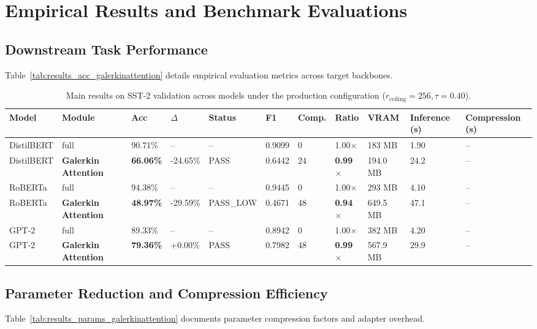 \section{Empirical Results and Benchmark Evaluations}

\subsection{Downstream Task Performance}
Table~\ref{tab:results_acc_galerkinattention} details empirical evaluation metrics across target backbones.

\begin{table}[t]
\centering
\small
\begin{tabular}{lllllllllll}
\toprule
\textbf{Model} & \textbf{Module} & \textbf{Acc} & \textbf{$\Delta$} & \textbf{Status} & \textbf{F1} & \textbf{Comp.} & \textbf{Ratio} & \textbf{VRAM} & \textbf{Inference (s)} & \textbf{Compression (s)} \\
\midrule
DistilBERT & full & 90.71\% & -- & -- & 0.9099 & 0 & 1.00$\times$ & 183 MB & 1.90 & -- \\
DistilBERT & \textbf{Galerkin Attention} & \textbf{66.06\%} & -24.65\% & PASS & 0.6442 & 24 & \textbf{0.99$\times$} & 194.0 MB & 24.2 & -- \\
RoBERTa & full & 94.38\% & -- & -- & 0.9445 & 0 & 1.00$\times$ & 293 MB & 4.10 & -- \\
RoBERTa & \textbf{Galerkin Attention} & \textbf{48.97\%} & -29.59\% & PASS\_LOW & 0.4671 & 48 & \textbf{0.94$\times$} & 649.5 MB & 47.1 & -- \\
GPT-2 & full & 89.33\% & -- & -- & 0.8942 & 0 & 1.00$\times$ & 382 MB & 4.20 & -- \\
GPT-2 & \textbf{Galerkin Attention} & \textbf{79.36\%} & +0.00\% & PASS & 0.7982 & 48 & \textbf{0.99$\times$} & 567.9 MB & 29.9 & -- \\
\bottomrule
\end{tabular}
\caption{Main results on SST-2 validation across models under the production configuration ($r_{\mathrm{ceiling}}=256, \tau=0.40$).}
\label{tab:main_sst2}
\end{table}

\subsection{Parameter Reduction and Compression Efficiency}
Table~\ref{tab:results_params_galerkinattention} documents parameter compression factors and adapter overhead.

